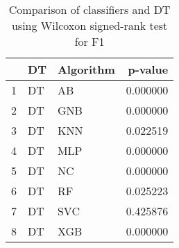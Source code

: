 \begin{table}
\footnotesize
\caption{Comparison of classifiers and DT using Wilcoxon signed-rank test for F1}
\label{tab:DT wilcoxon F1 comparison}
\begin{tabular}{lllr}
\hline
 & DT & Algorithm & p-value \\
\hline
1 & DT & AB & 0.000000 \\
2 & DT & GNB & 0.000000 \\
3 & DT & KNN & 0.022519 \\
4 & DT & MLP & 0.000000 \\
5 & DT & NC & 0.000000 \\
6 & DT & RF & 0.025223 \\
7 & DT & SVC & 0.425876 \\
8 & DT & XGB & 0.000000 \\
\hline
\end{tabular}
\end{table}
